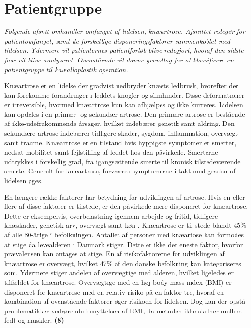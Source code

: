 \section{Patientgruppe}
\textit{Følgende afsnit omhandler omfanget af lidelsen, knæartrose. Afsnittet redegør for patientomfanget, samt de forskellige disponeringsfaktorer sammenkoblet med lidelsen. Ydermere vil patienternes patientforløb blive redegjort, hvoraf den sidste fase vil blive analyseret. Ovenstående vil danne grundlag for at klassificere en patientgruppe til knæalloplastik operation.}

Knæartrose er en lidelse der gradvist nedbryder knæets ledbrusk, hvorefter der kan forekomme forandringer i leddets knogler og slimhinder. Disse deformationer er irreversible, hvormed knæartrose kun kan afhjælpes og ikke kurreres. Lidelsen kan opdeles i en primær- og sekundær artrose. Den primære artrose er bestående af ikke-udefrakommende årsager, hvilket indebærer genetik samt aldring. Den sekundære artrose indebærer tidligere skader, sygdom, inflammation, overvægt samt traume. Knæartrose er en tilstand hvis hyppigste symptomer er smerter, nedsat mobilitet samt fejlstilling af leddet hos den påvirkede. Smerterne udtrykkes i forskellig grad, fra igangsættende smerte til kronisk tilstedeværende smerte. Generelt for knæartrose, forværres symptomerne i takt med graden af lidelsen øges. \citep{Lind2016b}

En længere række faktorer har betydning for udviklingen af artrose. Hvis en eller flere af disse faktorer er tilstede, er den påvirkede mere disponeret for knæartrose. Dette er eksempelvis, overbelastning igennem arbejde og fritid, tidligere knæskader, genetisk arv, overvægt samt køn \citep{brostrom2012}. Knæartrose er til stede blandt 45\% af alle 80-årige i befolkningen. Antallet af personer med knæartose kan formodes at stige da levealderen i Danmark stiger. Dette er ikke det eneste faktor, hvorfor prævalensen kan antages at stige. En af risikofaktorerne for udviklingen af knæartrose er overvægt, hvilket 47\% af den danske befolkning kan kategoriseres som. Ydermere stiger andelen af overvægtige med alderen, hvilket ligeledes er tilfældet for knæartrose. Overvægtige med en høj body-mass-index (BMI) er disponeret for knæartrose med en relativ risiko på en faktor tre, hvoraf en kombination af ovenstående faktorer øger risikoen for lidelsen. Dog kan der opstå problematikker vedrørende benyttelsen af BMI, da metoden ikke skelner mellem fedt og muskler. \textbf{(8)} \citep{brostrom2012} \citep{Vestergaard2014} \citep{Vestergaard2016} \citep{Lind2016} \citep{Lind2016b}

